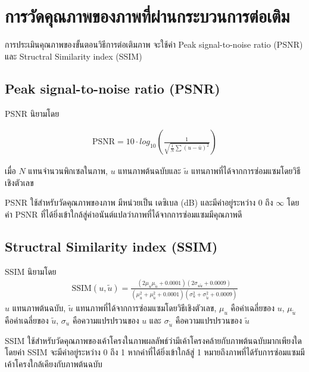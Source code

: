 \section{การวัดคุณภาพของภาพที่ผ่านกระบวนการต่อเติม}

\hspace{1cm} การประเมินคุณภาพของขั้นตอนวิธีการต่อเติมภาพ จะใช้ค่า Peak signal-to-noise ratio (PSNR) \cite{ref:PSNR} และ Structral Similarity index (SSIM) \cite{ref:SSIM} 

\subsection{Peak signal-to-noise ratio (PSNR)}

\hspace{1cm} PSNR นิยามโดย

\begin{align}
	\text{PSNR}  = 10 \cdot log_{10} ( \frac{1}{\sqrt{\frac{1}{N} \sum (u - \bar{u})^2}})
\end{align}

เมื่อ $N$ แทนจำนวนพิกเซลในภาพ, $u$ แทนภาพต้นฉบับและ $\tilde{u}$ แทนภาพที่ได้จากการซ่อมแซมโดยวิธีเชิงตัวเลข

\hspace{1cm} PSNR ใช้สำหรับวัดคุณภาพของภาพ มีหน่วยเป็น เดซิเบล (dB) และมีค่าอยู่ระหว่าง 0 ถึง $\infty$ โดยค่า PSNR ที่ได้ยิ่งเข้าใกล้สู่ค่าอนันต์แปลว่าภาพที่ได้จากการซ่อมแซมมีคุณภาพดี

\subsection{Structral Similarity index (SSIM)}
\hspace{1cm} SSIM นิยามโดย
\begin{align*}
	\text{SSIM}(u,\tilde{u}) = \frac{(2\mu_u\mu_{\tilde{u}} + 0.0001)(2\sigma_{u\tilde{u}} + 0.0009)}{(\mu_u^2+\mu_{\tilde{u}}^2+0.0001)(\sigma_u^2+\sigma_{\tilde{u}}^2+0.0009)}
\end{align*}
$u$ แทนภาพต้นฉบับ, $\tilde{u}$ แทนภาพที่ได้จากการซ่อมแซมโดยวิธีเชิงตัวเลข,  $\mu_u$ คือค่าเฉลี่ยของ $u$, $\mu_{\tilde{u}}$ คือค่าเฉลี่ยของ $\tilde{u}$, $\sigma_u$ คือความแปรปรวนของ $u$ และ $\sigma_{\tilde{u}}$ คือความแปรปรวนของ $\tilde{u}$

\hspace{1cm} SSIM ใช้สำหรับวัดคุณภาพของเค้าโครงในภาพผลลัพธ์ว่ามีเค้าโครงคล้ายกับภาพต้นฉบับมากเพียงใด โดยค่า SSIM จะมีค่าอยู่ระหว่าง 0 ถึง 1 หากค่าที่ได้ยิ่งเข้าใกล้สู่ 1 หมายถึงภาพที่ได้รับการซ่อมแซมมีเค้าโครงใกล้เคียงกับภาพต้นฉบับ